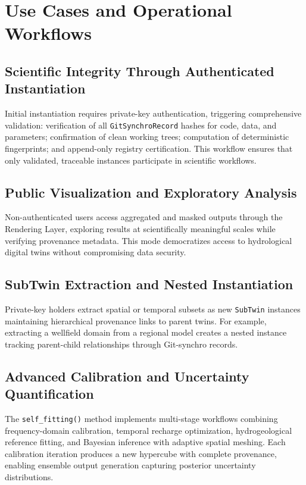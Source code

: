 \section{Use Cases and Operational Workflows}

\subsection{Scientific Integrity Through Authenticated Instantiation}

Initial instantiation requires private-key authentication, triggering comprehensive validation: verification of all \texttt{GitSynchroRecord} hashes for code, data, and parameters; confirmation of clean working trees; computation of deterministic fingerprints; and append-only registry certification. This workflow ensures that only validated, traceable instances participate in scientific workflows.

\subsection{Public Visualization and Exploratory Analysis}

Non-authenticated users access aggregated and masked outputs through the Rendering Layer, exploring results at scientifically meaningful scales while verifying provenance metadata. This mode democratizes access to hydrological digital twins without compromising data security.

\subsection{SubTwin Extraction and Nested Instantiation}

Private-key holders extract spatial or temporal subsets as new \texttt{SubTwin} instances maintaining hierarchical provenance links to parent twins. For example, extracting a wellfield domain from a regional model creates a nested instance tracking parent-child relationships through Git-synchro records.

\subsection{Advanced Calibration and Uncertainty Quantification}

The \texttt{self\_fitting()} method implements multi-stage workflows combining frequency-domain calibration, temporal recharge optimization, hydrogeological reference fitting, and Bayesian inference with adaptive spatial meshing. Each calibration iteration produces a new hypercube with complete provenance, enabling ensemble output generation capturing posterior uncertainty distributions.

